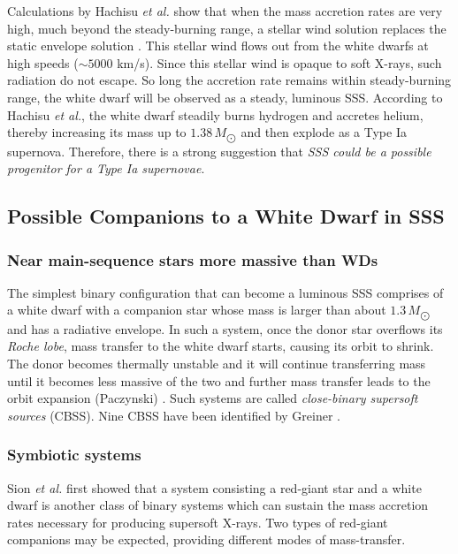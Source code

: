 			Calculations by Hachisu \emph{et al.} show that when the mass accretion rates are very high, much beyond the steady-burning range, a stellar wind solution replaces the static envelope solution \cite{hachisu96}. This stellar wind flows out from the white dwarfs at high speeds ($\sim 5000$ km/s). Since this stellar wind is opaque to soft X-rays, such radiation do not escape. So long the accretion rate remains within steady-burning range, the white dwarf will be observed as a steady, luminous SSS. According to Hachisu \emph{et al.}, the white dwarf steadily burns hydrogen and accretes helium, thereby increasing its mass up to $1.38\,M_{\bigodot}$ and then explode as a Type Ia supernova. Therefore, there is a strong suggestion that \emph{SSS could be a possible progenitor for a Type Ia supernovae}.
		
		\subsection{Possible Companions to a White Dwarf in SSS} \label{introduction:current_status:wd-companions}
			\subsubsection{Near main-sequence stars more massive than WDs}
				The simplest binary configuration that can become a luminous SSS comprises of a white dwarf with a companion star whose mass is larger than about $1.3\,M_{\bigodot}$ and has a radiative envelope. In such a system, once the donor star overflows its \emph{Roche lobe}, mass transfer to the white dwarf starts, causing its orbit to shrink. The donor becomes thermally unstable and it will continue transferring mass until it becomes less massive of the two and further mass transfer leads to the orbit expansion (Paczynski) \cite{paczynski71}. Such systems are called \emph{close-binary supersoft sources} (CBSS). Nine CBSS have been identified by Greiner \cite{greiner2000catalog,greiner2000catalogOnline}.
				
			\subsubsection{Symbiotic systems}
				Sion \emph{et al.}\cite{sion94} first showed that a system consisting a red-giant star and a white dwarf is another class of binary systems which can sustain the mass accretion rates necessary for producing supersoft X-rays. Two types of red-giant companions may be expected, providing different modes of mass-transfer.
				

